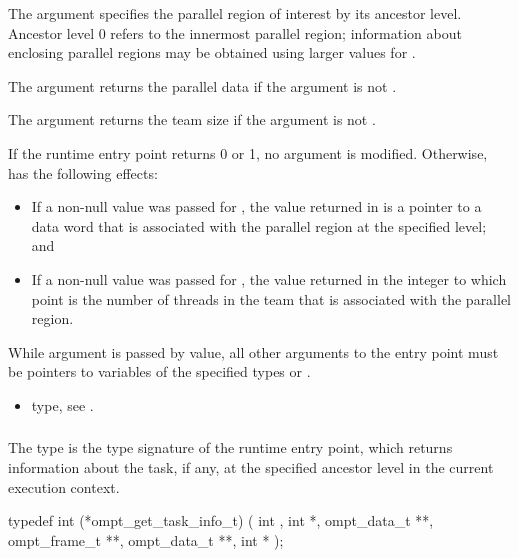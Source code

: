 \argdesc
The  argument specifies the parallel region of 
interest by its ancestor level. Ancestor level 0 refers to the innermost 
parallel region; information about enclosing parallel regions may be 
obtained using larger values for .

The  argument returns the parallel data if the 
argument is not .

The  argument returns the team size if the argument 
is not .

\effect
If the runtime entry point returns 0 or 1, no argument is modified. 
Otherwise,  has the following effects:

\begin{itemize}
\item If a non-null value was passed for , the value 
      returned in  is a pointer to a data word that is
      associated with the parallel region at the specified level; and
\item If a non-null value was passed for , the value
      returned in the integer to which  point is the 
      number of threads in the team that is associated with the parallel region.
\end{itemize}

\constraints
While argument  is passed by value, all other arguments 
to the entry point must be pointers to variables of the specified types or .

\crossreferences
\begin{itemize}
\item {} type, see .
\end{itemize}



\subsubsection{}
\label{sec:ompt_get_task_info_t}
\label{sec:ompt_get_task_info}

\summary
The  type is the type signature of the 
 runtime entry point, which returns information 
about the task, if any, at the specified ancestor level in the current 
execution context.

\format
\begin{ccppspecific}
\begin{omptInquiry}
typedef int (*ompt_get_task_info_t) (
  int ,
  int *,
  ompt_data_t **,
  ompt_frame_t **,
  ompt_data_t **,
  int *
);
\end{omptInquiry}
\end{ccppspecific}

